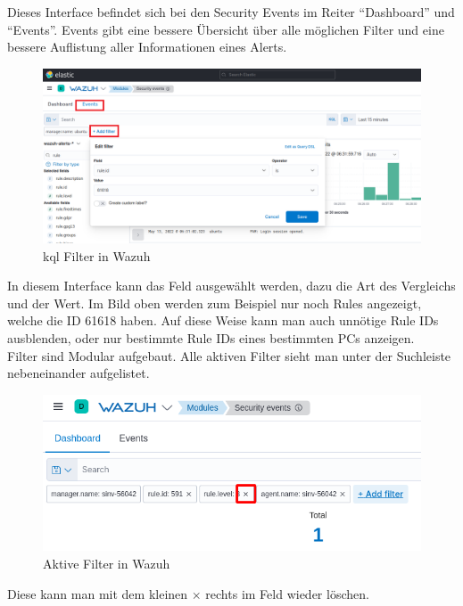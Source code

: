 Dieses Interface befindet sich bei den Security Events im Reiter ``Dashboard'' und ``Events''.
Events gibt eine bessere Übersicht über alle möglichen Filter und eine bessere Auflistung aller Informationen eines Alerts.
\begin{figure}[H]
    \centering
    \includegraphics[width=\linewidth]{../img/filter.png}
    \caption{\acrshort{kql} Filter in Wazuh}
\end{figure}

In diesem Interface kann das Feld ausgewählt werden, dazu die Art des Vergleichs und der Wert.
Im Bild oben werden zum Beispiel nur noch Rules angezeigt, welche die ID 61618 haben.
Auf diese Weise kann man auch unnötige Rule IDs ausblenden, oder nur bestimmte Rule IDs eines bestimmten PCs anzeigen.\\

Filter sind Modular aufgebaut. Alle aktiven Filter sieht man unter der Suchleiste nebeneinander aufgelistet.
\begin{figure}[H]
    \centering
    \includegraphics[width=0.7\linewidth]{../img/aktive-filter.png}
    \caption{Aktive Filter in Wazuh}
\end{figure}
Diese kann man mit dem kleinen $\times$ rechts im Feld wieder löschen.\\

